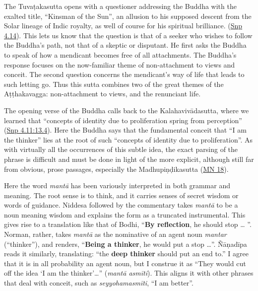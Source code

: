 \documentclass[12pt,openany]{book}%
\begin{document}
The \textsanskrit{Tuvaṭakasutta} opens with a questioner addressing the Buddha with the exalted title, “Kinsman of the Sun”, an allusion to his supposed descent from the Solar lineage of Indic royalty, as well of course for his spiritual brilliance. (\href{https://suttacentral.net/snp4.14/en/sujato}{Snp 4.14}). This lets us know that the question is that of a seeker who wishes to follow the Buddha’s path, not that of a skeptic or disputant. He first asks the Buddha to speak of how a mendicant becomes free of all attachments. The Buddha’s response focuses on the now-familiar theme of non-attachment to views and conceit. The second question concerns the mendicant’s way of life that leads to such letting go. Thus this sutta combines two of the great themes of the \textsanskrit{Aṭṭhakavagga}: non-attachment to views, and the renunciant life.

The opening verse of the Buddha calls back to the \textsanskrit{Kalahavivādasutta}, where we learned that “concepts of identity due to proliferation spring from perception” (\href{https://suttacentral.net/snp4.11/en/sujato\#13.4}{Snp 4.11:13.4}). Here the Buddha says that the fundamental conceit that “I am the thinker” lies at the root of such “concepts of identity due to proliferation”. As with virtually all the occurrences of this subtle idea, the exact parsing of the phrase is difficult and must be done in light of the more explicit, although still far from obvious, prose passages, especially the \textsanskrit{Madhupiṇḍikasutta} (\href{https://suttacentral.net/mn18/en/sujato}{MN 18}).

Here the word \textit{\textsanskrit{mantā}} has been variously interpreted in both grammar and meaning. The root sense is to think, and it carries senses of secret wisdom or words of guidance. Niddesa followed by the commentary takes \textit{\textsanskrit{mantā}} to be a noun meaning wisdom and explains the form as a truncated instrumental. This gives rise to a translation like that of Bodhi, “\textbf{By reflection}, he should stop … ”. Norman, rather, takes \textit{\textsanskrit{mantā}} as the nominative of an agent noun \textit{mantar} (“thinker”), and renders, “\textbf{Being a thinker}, he would put a stop …”. \textsanskrit{Ñāṇadīpa} reads it similarly, translating: “the \textbf{deep thinker} should put an end to.” I agree that it is in all probability an agent noun, but I construe it as “They would cut off the idea ‘I am the thinker’…” (\textit{\textsanskrit{mantā} \textsanskrit{asmīti}}). This aligns it with other phrases that deal with conceit, such as \textit{\textsanskrit{seyyohamasmīti}}, “I am better”.
\end{document}
